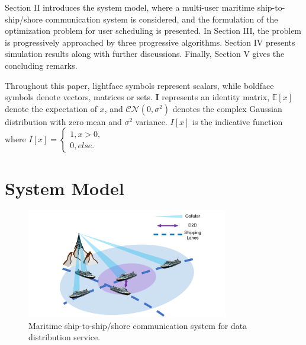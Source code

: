 \documentclass[conference]{IEEEtran}
\begin{document}
Section II introduces the system model, where a multi-user maritime ship-to-ship/shore communication system is considered, and the formulation of the optimization problem for user scheduling is presented. 
In Section III,  the problem is progressively approached by three progressive algorithms. 
Section IV presents simulation results along with further discussions. 
Finally, Section V gives the concluding remarks. 

Throughout this paper, lightface symbols represent scalars, while boldface symbols denote vectors, matrices or sets. ${\mathbf{I}}$ represents an identity matrix, $\mathbb{E}[x]$ denote the expectation of $x$, and $\mathcal{CN}(0, {\sigma}^2)$ denotes the complex Gaussian distribution with zero mean and ${\sigma}^2$ variance. $I\left[ x \right]$ is the indicative function where $I\left[ x \right] = \left\{ \begin{array}{l}
  1,x > 0,\\
  0,else.
  \end{array} \right.$



\section{System Model}\label{sec:2}

\begin{figure} [htb]
\begin{center}
\includegraphics*[width=8.8cm]{SysModel.png}
\end{center}
\vspace*{-4mm} 
\caption{Maritime ship-to-ship/shore communication system for data distribution service.}\label{fig:1}
\vspace*{-4mm} 
\end{figure}
\end{document}
